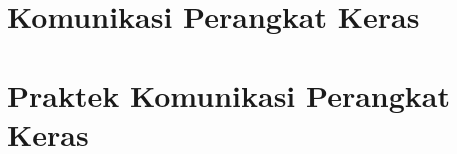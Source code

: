 \documentclass{wileySix}
\begin{document}
%
%

%
%

%
%

%
%

\chapter{Komunikasi Perangkat Keras}

\chapter{Praktek Komunikasi Perangkat Keras}




\end{document}
